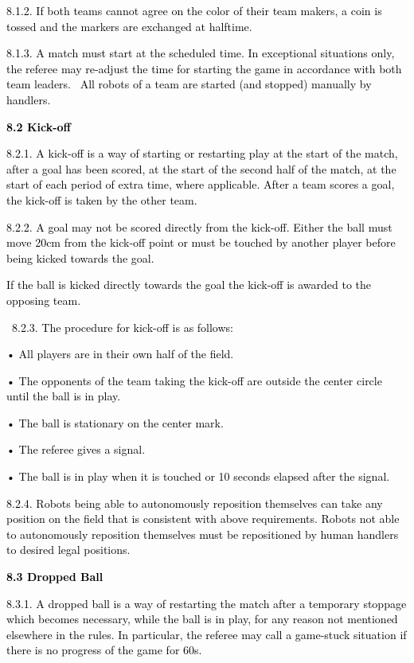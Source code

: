 \documentclass[a4paper]{article}
\begin{document}
\textcolor{black}{8.1.2. If both teams cannot agree on the color of their team makers, a coin is tossed and the markers
are exchanged at halftime.}

\textcolor{black}{8.1.3. A match must start at the scheduled time. In exceptional situations only, the referee may
re-adjust the time for starting the game in accordance with both team leaders. \ All robots of a team are started (and
stopped) manually by handlers.}

\textbf{\textcolor{black}{8.2 Kick-off}}

\textcolor{black}{8.2.1. A kick-off is a way of starting or restarting play at the start of the match, after a goal has
been scored, at the start of the second half of the match, at the start of each period of extra time, where applicable.
After a team scores a goal, the kick-off is taken by the other team.}

\textcolor{black}{8.2.2. A goal may not be scored directly from the kick-off. Either the ball must move 20cm from the
kick-off point or must be touched by another player before being kicked towards the goal.}

\textcolor{black}{If the ball is kicked directly towards the goal the kick-off is awarded to the opposing team.}

\textcolor{black}{\ 8.2.3. The procedure for kick-off is as follows: }

\textcolor{black}{• All players are in their own half of the field. }

\textcolor{black}{• The opponents of the team taking the kick-off are outside the center circle until the ball is in
play.}

\textcolor{black}{• The ball is stationary on the center mark. }

\textcolor{black}{• The referee gives a signal.}

\textcolor{black}{• The ball is in play when it is touched or 10 seconds elapsed after the signal.}

\textcolor{black}{8.2.4. Robots being able to autonomously reposition themselves can take any position on the field that
is consistent with above requirements. Robots not able to autonomously reposition themselves must be repositioned by
human handlers to desired legal positions. }

\textbf{\textcolor{black}{8.3 Dropped Ball}}

\textcolor{black}{8.3.1. A dropped ball is a way of restarting the match after a temporary stoppage which becomes
necessary, while the ball is in play, for any reason not mentioned elsewhere in the rules. In particular, the referee
may call a game-stuck situation if there is no progress of the game for 60s.}
\end{document}
